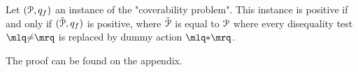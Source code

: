 \begin{corollary}
\label{cor:removing_diseq_tests}
Let $(\mathcal{P}, q_f)$ an instance of the "coverability problem". This instance is positive if and only if $(\tilde{\mathcal{P}}, q_f)$ is positive, where $\tilde{\mathcal{P}}$ is equal to $\mathcal{P}$ where every disequality test $\quotemarks{\diseqtestact}$ is replaced by dummy action $\quotemarks{\dummyact}$.  
\end{corollary}

The proof can be found on the appendix.

%
%
